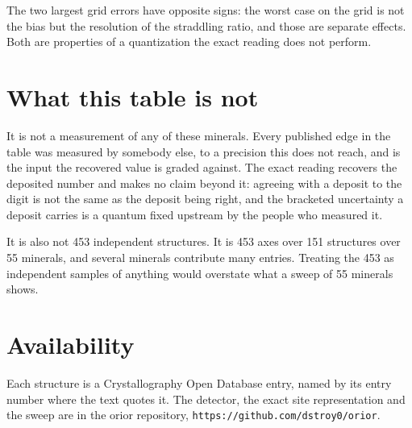 The two largest grid errors have opposite signs: the worst case on the grid is not the bias but the resolution of the straddling ratio, and those are separate effects. Both are properties of a quantization the exact reading does not perform.

\section{What this table is not}

It is not a measurement of any of these minerals. Every published edge in the table was measured by somebody else, to a precision this does not reach, and is the input the recovered value is graded against. The exact reading recovers the deposited number and makes no claim beyond it: agreeing with a deposit to the digit is not the same as the deposit being right, and the bracketed uncertainty a deposit carries is a quantum fixed upstream by the people who measured it.

It is also not 453 independent structures. It is 453 axes over 151 structures over 55 minerals, and several minerals contribute many entries. Treating the 453 as independent samples of anything would overstate what a sweep of 55 minerals shows.

\section{Availability}

Each structure is a Crystallography Open Database entry, named by its entry number where the text quotes it. The detector, the exact site representation and the sweep are in the orior repository, \texttt{https://github.com/dstroy0/orior}.
